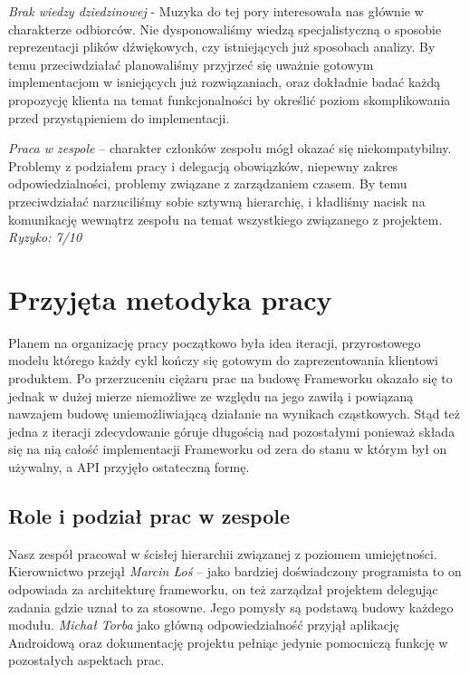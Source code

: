\noindent\emph{Brak wiedzy dziedzinowej} - Muzyka do tej pory interesowała nas głównie w charakterze odbiorców. Nie dysponowaliśmy wiedzą specjalistyczną o sposobie reprezentacji plików dźwiękowych, czy istniejących już sposobach analizy. By temu przeciwdziałać planowaliśmy przyjrzeć się uważnie gotowym implementacjom w isniejących już rozwiązaniach, oraz dokładnie badać każdą propozycję klienta na temat funkcjonalności by określić poziom skomplikowania przed przystąpieniem do implementacji.

\noindent\emph{Praca w zespole} -- charakter członków zespołu mógł okazać się niekompatybilny. Problemy z podziałem pracy i delegacją obowiązków, niepewny zakres odpowiedzialności, problemy związane z zarządzaniem czasem. By temu przeciwdziałać narzuciliśmy sobie sztywną hierarchię, i kładliśmy nacisk na komunikację wewnątrz zespołu na temat wszystkiego związanego z projektem. \emph{Ryzyko: 7/10} 

\chapter{Przyjęta metodyka pracy}

Planem na organizację pracy początkowo była idea iteracji, przyrostowego modelu którego każdy cykl
kończy się gotowym do zaprezentowania klientowi produktem. Po przerzuceniu ciężaru prac na budowę
Frameworku okazało się to jednak w dużej mierze niemożliwe ze względu na jego zawiłą i powiązaną
nawzajem budowę uniemożliwiającą działanie na wynikach cząstkowych. Stąd też jedna z iteracji
zdecydowanie góruje długością nad pozostałymi ponieważ składa się na nią całość implementacji
Frameworku od zera do stanu w którym był on używalny, a API przyjęło ostateczną formę.

\section{Role i podział prac w zespole}

Nasz zespół pracował w ścisłej hierarchii związanej z poziomem umiejętności. Kierownictwo przejął
\emph{Marcin Łoś} -- jako bardziej doświadczony programista to on odpowiada za architekturę frameworku, on też zarządzał projektem delegując zadania gdzie uznał to za stosowne. Jego pomysły są podstawą budowy każdego modułu. \emph{Michał Torba} jako
główną odpowiedzialność przyjął aplikację Androidową oraz dokumentację projektu pełniąc jedynie
pomocniczą funkcję w pozostałych aspektach prac.

